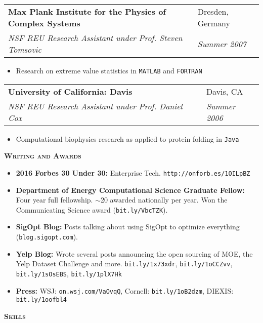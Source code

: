 \documentclass[letterpaper, 11pt]{article}
\makeatletter
\renewcommand{\section}[1]{%
  \begin{tcolorbox}
    \textsc{\textbf{\large{#1}}}
  \end{tcolorbox}
}
\newcommand{\entry}[4]{%
  \begin{tabularx}{\linewidth}{@{}Xl@{}}
    \textbf{#1} & #2          \\
    \textit{#3} & \textit{#4} \\
  \end{tabularx}
}
\makeatother
\begin{document}
  \entry{Max Plank Institute for the Physics of Complex Systems}{Dresden, Germany}{NSF REU Research Assistant under Prof. Steven Tomsovic}{Summer 2007}
  \begin{itemize}
    \item{Research on extreme value statistics in \texttt{MATLAB} and \texttt{FORTRAN}}
  \end{itemize}

  \entry{University of California: Davis}{Davis, CA}{NSF REU Research Assistant under Prof. Daniel Cox}{Summer 2006}
  \begin{itemize}
    \item{Computational biophysics research as applied to protein folding in \texttt{Java}}
  \end{itemize}

\section{Writing and Awards}

\begin{itemize}

\item {\bf 2016 Forbes 30 Under 30:} Enterprise Tech. \texttt{http://onforb.es/1OILpBZ}
\item {\bf Department of Energy Computational Science Graduate Fellow:} Four year full fellowship. $\sim$20 awarded nationally per year. Won the Communicating Science award (\texttt{bit.ly/VbcTZK}).
\item {\bf SigOpt Blog:} Posts talking about using SigOpt to optimize everything (\texttt{blog.sigopt.com}).
\item {\bf Yelp Blog:} Wrote several posts announcing the open sourcing of MOE, the Yelp Dataset Challenge and more. \texttt{bit.ly/1x73xdr}, \texttt{bit.ly/1oCCZvv}, \texttt{bit.ly/1sOsEBS}, \texttt{bit.ly/1plX7Hk}
\item {\bf Press:} WSJ: \texttt{on.wsj.com/VaOvqQ}, Cornell: \texttt{bit.ly/1oB2dzm},  DIEXIS: \texttt{bit.ly/1oofbl4}

\end{itemize}


\section{Skills}

\end{document}
